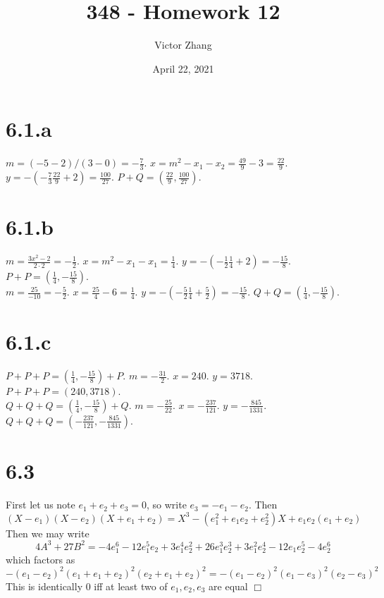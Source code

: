 \documentclass{article}
\title{348 - Homework 12}
\author{Victor Zhang}
\date{April 22, 2021}
\begin{document}
\maketitle

\section*{6.1.a}
$m = (-5-2)/(3-0) = -\frac{7}{3}$. $x = m^2 - x_1 - x_2 = \frac{49}{9} - 3 = \frac{22}{9}$. $y = -(-\frac{7}{3}\frac{22}{9}+2) = \frac{100}{27}$. $P + Q = (\frac{22}{9},\frac{100}{27})$.

\section*{6.1.b}
$m = \frac{3x^2-2}{2\cdot2} = -\frac{1}{2}$. $x = m^2 - x_1 - x_1 = \frac{1}{4}$. $y = -(-\frac{1}{2}\frac{1}{4}+2) = -\frac{15}{8}$. $P + P = (\frac{1}{4},-\frac{15}{8})$.\\
$m = \frac{25}{-10} = -\frac{5}{2}$. $x = \frac{25}{4} - 6 = \frac{1}{4}$. $y = -(-\frac{5}{2}\frac{1}{4} + \frac{5}{2}) = -\frac{15}{8}$. $Q + Q = (\frac{1}{4}, -\frac{15}{8})$.

\section*{6.1.c}
$P + P + P = (\frac{1}{4},-\frac{15}{8}) + P$. $m = -\frac{31}{2}$. $x = 240$. $y = 3718$. $P + P + P = (240,3718)$.\\
$Q + Q + Q = (\frac{1}{4},-\frac{15}{8}) + Q$. $m = -\frac{25}{22}$. $x = -\frac{237}{121}$. $y = -\frac{845}{1331}$. $Q + Q + Q = (-\frac{237}{121},-\frac{845}{1331})$.

\section*{6.3}
First let us note $e_1 + e_2 + e_3 = 0$, so write $e_3 = - e_1 - e_2$. Then
$$(X - e_1)(X - e_2)(X + e_1 + e_2) = X^3 - (e_1^2 + e_1e_2 + e_2^2)X + e_1e_2(e_1+e_2)$$
Then we may write
$$4A^3 + 27B^2 = -4 e_1^6 - 12 e_1^5 e_2 + 3 e_1^4 e_2^2 + 26 e_1^3 e_2^3 + 3 e_1^2 e_2^4 - 12 e_1 e_2^5 - 4 e_2^6$$
which factors as
$$-(e_1-e_2)^2(e_1+e_1+e_2)^2(e_2+e_1+e_2)^2 = -(e_1-e_2)^2(e_1-e_3)^2(e_2-e_3)^2$$
This is identically 0 iff at least two of $e_1,e_2,e_3$ are equal $\Box$
\end{document}
